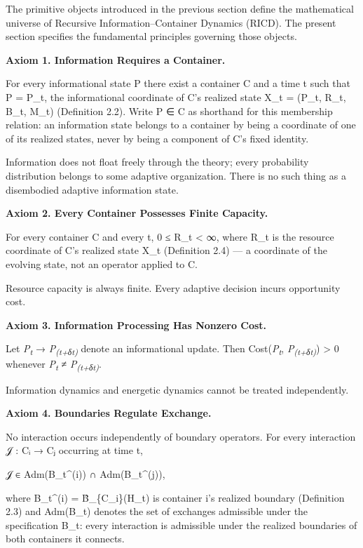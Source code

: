 \documentclass[
]{article}
\begin{document}
The primitive objects introduced in the previous section define the
mathematical universe of Recursive Information--Container Dynamics
(RICD). The present section specifies the fundamental principles
governing those objects.

\textbf{Axiom 1. Information Requires a Container.}

For every informational state P there exist a container C and a time t
such that P = P\_t, the informational coordinate of C's realized state
X\_t = (P\_t, R\_t, B\_t, M\_t) (Definition 2.2). Write P ∈ C as
shorthand for this membership relation: an information state belongs to
a container by being a coordinate of one of its realized states, never
by being a component of C's fixed identity.

Information does not float freely through the theory; every probability
distribution belongs to some adaptive organization. There is no such
thing as a disembodied adaptive information state.

\textbf{Axiom 2. Every Container Possesses Finite Capacity.}

For every container C and every t, 0 ≤ R\_t \textless{} ∞, where R\_t
is the resource coordinate of C's realized state X\_t (Definition 2.4)
--- a coordinate of the evolving state, not an operator applied to C.

Resource capacity is always finite. Every adaptive decision incurs
opportunity cost.

\textbf{Axiom 3. Information Processing Has Nonzero Cost.}

Let \emph{P\textsubscript{t}} → \emph{P\textsubscript{(t+δt)}} denote an
informational update. Then Cost(\emph{P\textsubscript{t}},
\emph{P\textsubscript{(t+δt)}}) \textgreater{} 0 whenever
\emph{P\textsubscript{t}} ≠ \emph{P\textsubscript{(t+δt)}}.

Information dynamics and energetic dynamics cannot be treated
independently.

\textbf{Axiom 4. Boundaries Regulate Exchange.}

No interaction occurs independently of boundary operators. For every
interaction 𝒥 : Cᵢ → Cⱼ occurring at time t,

𝒥 ∈ Adm(B\_t\^{}(i)) ∩ Adm(B\_t\^{}(j)),

where B\_t\^{}(i) = B̂\_\{C\_i\}(H\_t) is container i's realized boundary
(Definition 2.3) and Adm(B\_t) denotes the set of exchanges admissible
under the specification B\_t: every interaction is admissible under the
realized boundaries of both containers it connects.
\end{document}
